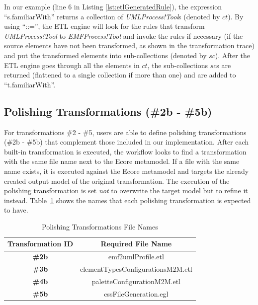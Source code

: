 
In our example (line 6 in Listing \ref{lst:etlGeneratedRule}), the expression ``s.familiarWith'' returns a collection of \emph{UMLProcess!Tool}s (denoted by $ct$). By using ``::='', the ETL engine will look for the rules that transform \emph{UMLProcess!Tool} to \emph{EMFProcess!Tool} and invoke the rules if 
necessary (if the source elements have not been transformed, as shown in the transformation trace) and put the transformed elements into sub-collections 
(denoted by $sc$). 
After the ETL engine goes through all the elements in $ct$, the sub-collections $sc$s are returned (flattened to a single collection if more than one) and are added to ``t.familiarWith''.


\vspace{5mm}
\subsection{Polishing Transformations (\#2b - \#5b)} 
\label{sec:transformationPatches}

For transformations \#2 - \#5, users are able to define polishing transformations (\#2b - \#5b) that complement those included in our implementation. 
After each built-in transformation is executed, the workflow looks to find a transformation with the same file name next to the Ecore metamodel. 
If a file with the same name exists, it is executed against the Ecore metamodel and targets the already created output model of the original transformation. 
The execution of the polishing transformation is set \textit{not} to overwrite the target model but to refine it instead.
Table~\ref{tab:polishingTransformationsNames} shows the names that each polishing transformation is expected to have.

\begin{table}[ht!]
	\centering
	\begin{tabular}{|c|c|}
		\cline{1-2}
		\textbf{Transformation ID}  & \textbf{Required File Name}\\ \hline
		\textbf{\#2b} & emf2umlProfile.etl\\ \hline
		\textbf{\#3b} & elementTypesConfigurationsM2M.etl\\ \hline
		\textbf{\#4b} & paletteConfigurationM2M.etl\\ \hline
		\textbf{\#5b} & cssFileGeneration.egl\\ \hline
		\cline{1-2}
	\end{tabular}
	\caption{Polishing Transformations File Names}
	\label{tab:polishingTransformationsNames}
\end{table}



